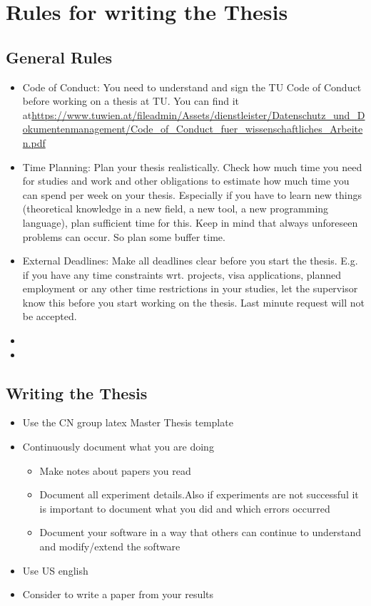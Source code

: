 \chapter{Rules for writing the Thesis}

\section{General Rules}
\begin{itemize}
    \item Code of Conduct: You need to understand and sign the TU Code of Conduct before working on a thesis at TU.
    You can find it at\url{https://www.tuwien.at/fileadmin/Assets/dienstleister/Datenschutz_und_Dokumentenmanagement/Code_of_Conduct_fuer_wissenschaftliches_Arbeiten.pdf} 
    \item Time Planning: Plan your thesis realistically. Check how much time you need for studies and work and other obligations to estimate how much time you can spend per week on your thesis. Especially if you have to learn new things (theoretical knowledge in a new field, a new tool, a new programming language), plan sufficient time for this. Keep in mind that always unforeseen problems can occur. So plan some buffer time.
    \item External Deadlines: Make all deadlines clear before you start the thesis. E.g. if you have any time constraints wrt. projects, visa applications, planned employment or any other time restrictions in your studies, let the supervisor know this before you start working on the thesis. Last minute request will not be accepted. 
    \item 
    \item 
\end{itemize}


\section{Writing the Thesis}

\begin{itemize}
	\item Use the CN group latex Master Thesis template
	\item Continuously document what you are doing
	\begin{itemize}
		\item  Make notes about papers you read
		\item  Document all experiment details.Also if experiments are not successful it is important to document what you did and which errors occurred
		\item Document your software in a way that others can continue to understand and modify/extend the software 
	\end{itemize}
	\item Use US english
	\item Consider to write a paper from your results
	
\end{itemize}


